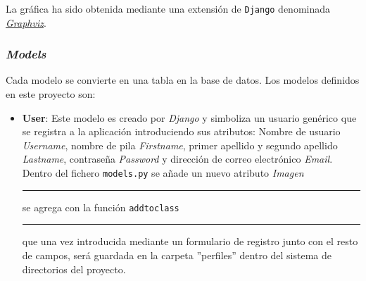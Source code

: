 \documentclass[a4paper, 12pt]{book}
\begin{document}
La gr\'afica ha sido obtenida mediante una extensi\'on de \texttt{Django} denominada 
\href{https://code.djangoproject.com/wiki/DjangoGraphviz}{\textit{Graphviz}}.

\subsubsection{\textit{Models}} 
\label{sec:models}
Cada modelo se convierte en una tabla en la base de datos. Los modelos definidos en este proyecto son:

\begin{itemize}
  \item {\bfseries User}: Este modelo es creado por \textit{Django} y simboliza un usuario gen\'erico que se registra a la aplicaci\'on introduciendo sus 
  atributos: Nombre de usuario \textit{Username}, nombre de pila \textit{Firstname}, primer apellido y segundo apellido \textit{Lastname}, contrase\~na 
  \textit{Password} 
  y direcci\'on de correo electr\'onico \textit{Email}. Dentro del fichero \texttt{models.py} se a\~nade un nuevo atributo \textit{Imagen} 
  \rule[1mm]{4mm}{0.1mm}se agrega con la funci\'on \texttt{addtoclass}\rule[1mm]{4mm}{0.1mm} que una vez introducida mediante un formulario de registro 
  junto con el resto de campos, ser\'a guardada en la carpeta ''perfiles'' dentro del sistema de directorios del proyecto. 
  

\end{itemize}
\end{document}
